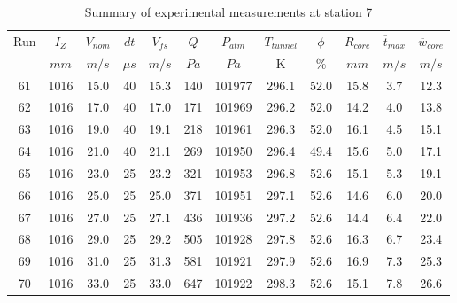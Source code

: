 \begin{table}[H]
\begin{center}
\begin{tabular}{|cccccccccccc|}
	\hline
	Run & $I_Z$ & $V_{nom}$ & $dt$ & $V_{fs}$ & $Q$ & $P_{atm}$ & $T_{tunnel}$ & $\phi$ & $R_{core}$ & $\overline{t}_{max}$ & $\overline{w}_{core}$\\
	  & $mm$ & $m/s$ & $\mu s$ & $m/s$ & $Pa$ & $Pa$ & K & $\%$ & $mm$ & $m/s$ & $m/s$\\
	\hline
	61 & 1016 & 15.0 & 40 & 15.3 & 140 & 101977 & 296.1 & 52.0 & 15.8 & 3.7 & 12.3\\
	62 & 1016 & 17.0 & 40 & 17.0 & 171 & 101969 & 296.2 & 52.0 & 14.2 & 4.0 & 13.8\\
	63 & 1016 & 19.0 & 40 & 19.1 & 218 & 101961 & 296.3 & 52.0 & 16.1 & 4.5 & 15.1\\
	64 & 1016 & 21.0 & 40 & 21.1 & 269 & 101950 & 296.4 & 49.4 & 15.6 & 5.0 & 17.1\\
	65 & 1016 & 23.0 & 25 & 23.2 & 321 & 101953 & 296.8 & 52.6 & 15.1 & 5.3 & 19.1\\
	66 & 1016 & 25.0 & 25 & 25.0 & 371 & 101951 & 297.1 & 52.6 & 14.6 & 6.0 & 20.0\\
	67 & 1016 & 27.0 & 25 & 27.1 & 436 & 101936 & 297.2 & 52.6 & 14.4 & 6.4 & 22.0\\
	68 & 1016 & 29.0 & 25 & 29.2 & 505 & 101928 & 297.8 & 52.6 & 16.3 & 6.7 & 23.4\\
	69 & 1016 & 31.0 & 25 & 31.3 & 581 & 101921 & 297.9 & 52.6 & 16.9 & 7.3 & 25.3\\
	70 & 1016 & 33.0 & 25 & 33.0 & 647 & 101922 & 298.3 & 52.6 & 15.1 & 7.8 & 26.6\\
	\hline
\end{tabular}
\caption{Summary of experimental measurements at station 7}
\label{table:experiment_results_7}
\end{center}
\end{table}
